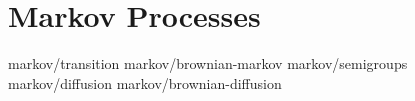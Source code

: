 \chapter	{Markov Processes}

	{markov/transition}
	{markov/brownian-markov}
	{markov/semigroups}
	{markov/diffusion}
	{markov/brownian-diffusion}
